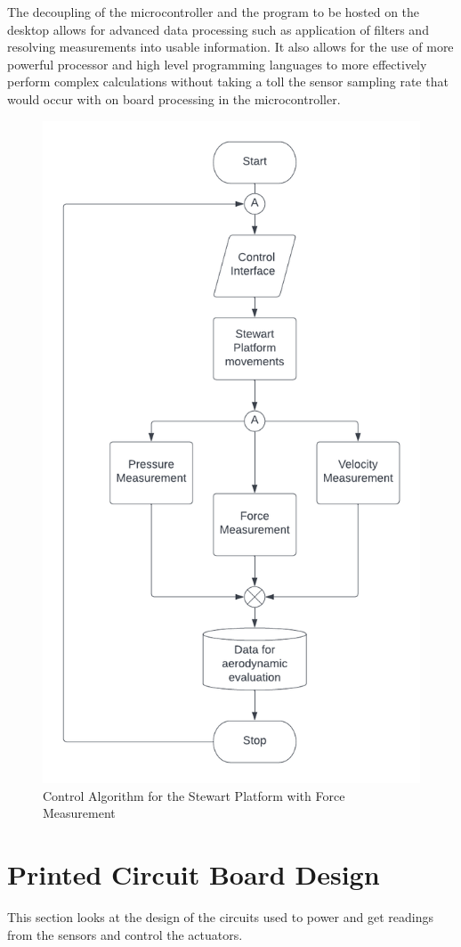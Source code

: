 The decoupling of the microcontroller and the program to be hosted on the desktop allows for advanced data processing such as application of filters and resolving measurements into usable information. It also allows for the use of more powerful processor and high level programming languages to more effectively perform complex calculations without taking a toll the sensor sampling rate that would occur with on board processing in the microcontroller.
\begin{center}
	\begin{figure}[H]
	\centering
	\includegraphics[width=0.7\linewidth]{Figures/Fig14}
	\caption[Control Algorithm]{Control Algorithm for the Stewart Platform with Force Measurement}
	\end{figure}
\end{center}
\section{Printed Circuit Board Design}
This section looks at the design of the circuits used to power and get readings from the sensors and control the actuators.

